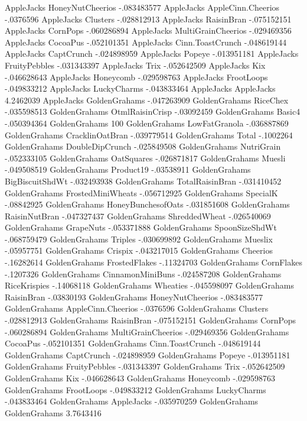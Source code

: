 AppleJacks	HoneyNutCheerios	-.083483577
AppleJacks	AppleCinn.Cheerios	-.0376596
AppleJacks	Clusters	-.028812913
AppleJacks	RaisinBran	-.075152151
AppleJacks	CornPops	-.060286894
AppleJacks	MultiGrainCheerios	-.029469356
AppleJacks	CocoaPus	-.052101351
AppleJacks	Cinn.ToastCrunch	-.048619144
AppleJacks	CaptCrunch	-.024898959
AppleJacks	Popeye	-.013951181
AppleJacks	FruityPebbles	-.031343397
AppleJacks	Trix	-.052642509
AppleJacks	Kix	-.046628643
AppleJacks	Honeycomb	-.029598763
AppleJacks	FrootLoops	-.049833212
AppleJacks	LuckyCharms	-.043833464
AppleJacks	AppleJacks	4.2462039
AppleJacks	GoldenGrahams	-.047263909
GoldenGrahams	RiceChex	-.035598513
GoldenGrahams	OtmlRaisinCrisp	-.03092459
GoldenGrahams	Basic4	-.050394364
GoldenGrahams	100%
GoldenGrahams	LowFatGranola	-.036887869
GoldenGrahams	CracklinOatBran	-.039779514
GoldenGrahams	Total	-.1002264
GoldenGrahams	DoubleDipCrunch	-.025849508
GoldenGrahams	NutriGrain	-.052333105
GoldenGrahams	OatSquares	-.026871817
GoldenGrahams	Muesli	-.049508519
GoldenGrahams	Product19	-.03538911
GoldenGrahams	BigBiscuitShdWt	-.032493938
GoldenGrahams	TotalRaisinBran	-.031410452
GoldenGrahams	FrostedMiniWheats	-.056712925
GoldenGrahams	SpecialK	-.08842925
GoldenGrahams	HoneyBunchesofOats	-.031851608
GoldenGrahams	RaisinNutBran	-.047327437
GoldenGrahams	ShreddedWheat	-.026540069
GoldenGrahams	GrapeNuts	-.053371888
GoldenGrahams	SpoonSizeShdWt	-.068759479
GoldenGrahams	Triples	-.030699892
GoldenGrahams	Mueslix	-.05957751
GoldenGrahams	Crispix	-.043217015
GoldenGrahams	Cheerios	-.16282614
GoldenGrahams	FrostedFlakes	-.11324703
GoldenGrahams	CornFlakes	-.1207326
GoldenGrahams	CinnamonMiniBuns	-.024587208
GoldenGrahams	RiceKrispies	-.14068118
GoldenGrahams	Wheaties	-.045598097
GoldenGrahams	RaisinBran	-.03830193
GoldenGrahams	HoneyNutCheerios	-.083483577
GoldenGrahams	AppleCinn.Cheerios	-.0376596
GoldenGrahams	Clusters	-.028812913
GoldenGrahams	RaisinBran	-.075152151
GoldenGrahams	CornPops	-.060286894
GoldenGrahams	MultiGrainCheerios	-.029469356
GoldenGrahams	CocoaPus	-.052101351
GoldenGrahams	Cinn.ToastCrunch	-.048619144
GoldenGrahams	CaptCrunch	-.024898959
GoldenGrahams	Popeye	-.013951181
GoldenGrahams	FruityPebbles	-.031343397
GoldenGrahams	Trix	-.052642509
GoldenGrahams	Kix	-.046628643
GoldenGrahams	Honeycomb	-.029598763
GoldenGrahams	FrootLoops	-.049833212
GoldenGrahams	LuckyCharms	-.043833464
GoldenGrahams	AppleJacks	-.035970259
GoldenGrahams	GoldenGrahams	3.7643416
